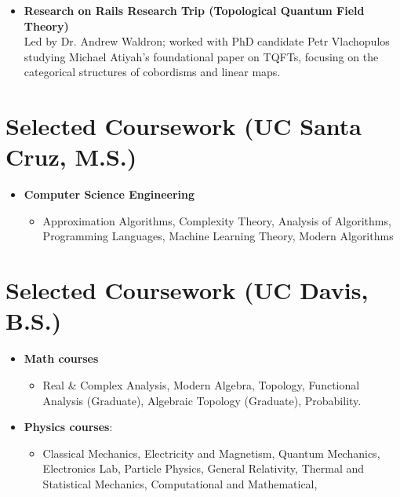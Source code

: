 \documentclass{curriculum-vitae}
\begin{document}
\begin{itemize}
  \item \textbf{Research on Rails Research Trip (Topological Quantum Field Theory)} \\
    Led by Dr. Andrew Waldron; worked with PhD candidate Petr Vlachopulos studying Michael Atiyah's foundational paper on TQFTs, focusing on the categorical structures of cobordisms and linear maps.


\end{itemize}
\section{Selected Coursework (UC Santa Cruz, M.S.)}
\begin{itemize}
  \item\textbf{Computer Science Engineering}
    \begin{itemize}
      \item Approximation Algorithms, Complexity Theory, Analysis of Algorithms, Programming Languages, Machine Learning Theory, Modern Algorithms
    \end{itemize}


\end{itemize}

\section{Selected Coursework (UC Davis, B.S.)}
\begin{itemize}
  \item\textbf{Math courses}
    \begin{itemize}
      \item Real \& Complex Analysis, Modern Algebra, Topology, Functional Analysis (Graduate), Algebraic Topology (Graduate), Probability.
    \end{itemize}


  \item\textbf{Physics courses}:
    \begin{itemize}
      \item Classical Mechanics,
        Electricity and Magnetism,
        Quantum Mechanics,
        Electronics Lab,
        Particle Physics,
        General Relativity,
        Thermal and Statistical Mechanics,
        Computational and Mathematical,

    \end{itemize}

\end{itemize}
\end{document}
